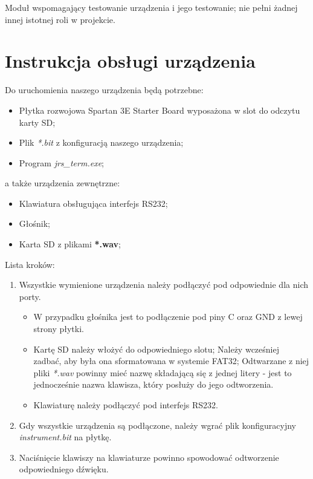 \documentclass{article}
\begin{document}
Moduł wspomagający testowanie urządzenia i jego testowanie; nie pełni żadnej innej istotnej roli w projekcie.

\section{Instrukcja obsługi urządzenia}

Do uruchomienia naszego urządzenia będą potrzebne:

\begin{itemize}
    \item Płytka rozwojowa Spartan 3E Starter Board wyposażona w slot do odczytu karty SD;
    \item Plik \textit{*.bit} z konfiguracją naszego urządzenia;
    \item Program \textit{jrs\_term.exe};
\end{itemize}

a także urządzenia zewnętrzne:

\begin{itemize}
    \item Klawiatura obsługująca interfejs RS232;
    \item Głośnik;
    \item Karta SD z plikami \textbf{*.wav};
\end{itemize}

Lista kroków:

\begin{enumerate}
    \item Wszystkie wymienione urządzenia należy podłączyć pod odpowiednie dla nich porty.
    \begin{itemize}
        \item W przypadku głośnika jest to podłączenie pod piny C oraz GND z lewej strony płytki.
        \item Kartę SD należy włożyć do odpowiedniego slotu; Należy wcześniej zadbać, aby była ona sformatowana w systemie FAT32; Odtwarzane z niej pliki \textit{*.wav} powinny mieć nazwę składającą się z jednej litery - jest to jednocześnie nazwa klawisza, który posłuży do jego odtworzenia.
        \item Klawiaturę należy podłączyć pod interfejs RS232.
    \end{itemize}
    \item Gdy wszystkie urządzenia są podłączone, należy wgrać plik konfiguracyjny \textit{instrument.bit} na płytkę.
    \item Naciśnięcie klawiszy na klawiaturze powinno spowodować odtworzenie odpowiedniego dźwięku.
\end{enumerate}
\end{document}
